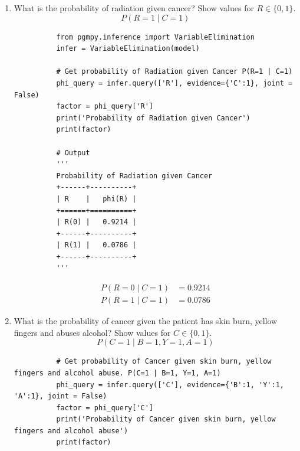 \begin{enumerate}
\begin{center}
        \end{center}
  \item What is the probability of radiation given cancer? Show values for $R\in\{0, 1\}$.
        $$P(R=1\mid C=1)$$
        \begin{lstlisting}
          from pgmpy.inference import VariableElimination
          infer = VariableElimination(model)

          # Get probability of Radiation given Cancer P(R=1 | C=1)
          phi_query = infer.query(['R'], evidence={'C':1}, joint = False)
          factor = phi_query['R']
          print('Probability of Radiation given Cancer')
          print(factor)

          # Output
          '''
          Probability of Radiation given Cancer
          +------+----------+
          | R    |   phi(R) |
          +======+==========+
          | R(0) |   0.9214 |
          +------+----------+
          | R(1) |   0.0786 |
          +------+----------+
          '''
        \end{lstlisting}
        \begin{align*}
          P(R=0\mid C=1) & =0.9214 \\
          P(R=1\mid C=1) & =0.0786
        \end{align*}
  \item What is the probability of cancer given the patient has skin burn, yellow fingers and abuses alcohol? Show values for $C\in\{0, 1\}$.
        $$P(C=1\mid B=1, Y=1, A=1)$$
        \begin{lstlisting}
          # Get probability of Cancer given skin burn, yellow fingers and alcohol abuse. P(C=1 | B=1, Y=1, A=1)
          phi_query = infer.query(['C'], evidence={'B':1, 'Y':1, 'A':1}, joint = False)
          factor = phi_query['C']
          print('Probability of Cancer given skin burn, yellow fingers and alcohol abuse')
          print(factor)


\end{lstlisting}
\end{enumerate}
